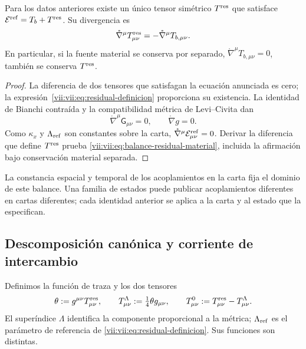 \begin{theorem}
\label{vii:vii:thm:residual-unicidad-balance}
Para los datos anteriores existe un único tensor simétrico
\(T^{\rm res}\) que satisface
\(\mathcal E^{\rm ref}=T_b+T^{\rm res}\). Su divergencia es
\begin{equation}
 \mathring\nabla^\mu T^{\rm res}_{\mu\nu}
 =-\mathring\nabla^\mu T_{b,\mu\nu}.
 \label{vii:vii:eq:balance-residual-material}
\end{equation}
En particular, si la fuente material se conserva por separado,
\(\mathring\nabla^\mu T_{b,\mu\nu}=0\), también se conserva
\(T^{\rm res}\).
\end{theorem}
\begin{proof}
La diferencia de dos tensores que satisfagan la ecuación anunciada es
cero; la expresión~\eqref{vii:vii:eq:residual-definicion} proporciona su
existencia. La identidad de Bianchi contraída y la compatibilidad métrica
de Levi--Civita dan
\[
 \mathring\nabla^\mu\mathsf G_{\mu\nu}=0,
 \qquad \mathring\nabla g=0.
\]
Como \(\kappa_x\) y \(\Lambda_{\rm ref}\) son constantes sobre la
carta, \(\mathring\nabla^\mu\mathcal E^{\rm ref}_{\mu\nu}=0\).
Derivar la diferencia que define \(T^{\rm res}\) prueba
\eqref{vii:vii:eq:balance-residual-material}, incluida la afirmación bajo
conservación material separada.
\end{proof}

La constancia espacial y temporal de los acoplamientos en la carta fija
el dominio de este balance. Una familia de estados puede publicar
acoplamientos diferentes en cartas diferentes; cada identidad anterior
se aplica a la carta y al estado que la especifican.

\subsection{Descomposición canónica y corriente de intercambio}
\label{vii:vii:subsec:traza-corriente-residual}

Definimos la función de traza y los dos tensores
\begin{equation}
 \theta:=g^{\mu\nu}T^{\rm res}_{\mu\nu},\qquad
 T^{\Lambda}_{\mu\nu}:=\tfrac14\theta g_{\mu\nu},\qquad
 T^{0}_{\mu\nu}:=T^{\rm res}_{\mu\nu}-T^{\Lambda}_{\mu\nu}.
 \label{vii:vii:eq:descomposicion-traza-residual}
\end{equation}
El superíndice \(\Lambda\) identifica la componente proporcional a la
métrica; \(\Lambda_{\rm ref}\) es el parámetro de referencia de
\eqref{vii:vii:eq:residual-definicion}. Sus funciones son distintas.

